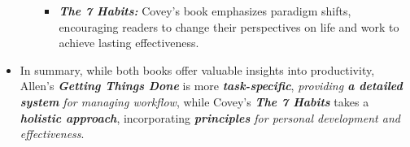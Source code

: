 \documentclass[11pt]{article}
\begin{document}
\begin{itemize}
\begin{itemize}
\begin{itemize}
\item \emph{\textbf{The 7 Habits:}} Covey's book emphasizes paradigm shifts, encouraging readers to change their perspectives on life and work to achieve lasting effectiveness.
\end{itemize}
\end{itemize}


\item In summary, while both books offer valuable insights into productivity, Allen's \textit{\textbf{Getting Things Done}} is more \emph{\textbf{task-specific}}, \emph{providing \textbf{a detailed system} for managing workflow}, while Covey's \emph{\textbf{The 7 Habits}} takes a \emph{\textbf{holistic approach}}, incorporating \emph{\textbf{principles} for personal development and effectiveness}.
\end{itemize}
\end{document}
